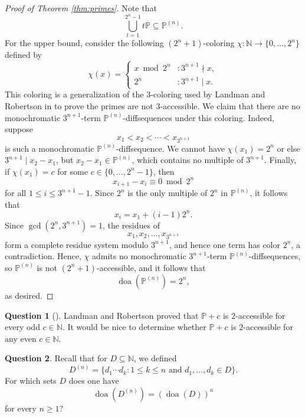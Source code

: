 \documentclass{amsart}
\theoremstyle{definition}
\newtheorem{question}{Question}
\begin{document}
\begin{proof}[Proof of Theorem \ref{thm:primes}]

Note that $$\bigcup_{t=1}^{2^n-1}t\mathbb{P}\subseteq \mathbb P^{(n)}.$$ For the upper bound, consider the following $(2^n+1)$-coloring $\chi : \mathbb{N} \to \{0,\dots,2^n\}$ defined by $$\chi(x)=\begin{cases}
    x\bmod 2^n & : 3^{n+1} \nmid x, \\
    2^n & : 3^{n+1} \mid x.
\end{cases}$$ This coloring is a generalization of the $3$-coloring used by Landman and Robertson in \cite{landman2007avoiding} to prove the primes are not $3$-accessible. We claim that there are no monochromatic $3^{n+1}$-term $\mathbb{P}^{(n)}$-diffsequences under this coloring. Indeed, suppose $$x_1<x_2<\cdots<x_{3^{n+1}}$$ is such a monochromatic $\mathbb{P}^{(n)}$-diffsequence. We cannot have $\chi(x_1)=2^n$ or else $3^{n+1} \mid x_{2}-x_1$, but $x_{2}-x_1 \in \mathbb{P}^{(n)}$, which contains no multiple of $3^{n+1}$. Finally, if $\chi(x_1)=c$ for some $c \in \{0,\dots,2^n-1\}$, then $$x_{i+1}-x_{i} \equiv 0 \bmod{2^n}$$ for all $1 \leq i \leq 3^{n+1}-1$. Since $2^n$ is the only multiple of $2^n$ in $\mathbb{P}^{(n)}$, it follows that $$x_{i}=x_1+(i-1)2^n.$$ Since $\gcd(2^n,3^{n+1})=1$, the residues of $$x_1,x_2,\dots,x_{3^{n+1}}$$ form a complete residue system modulo $3^{n+1}$, and hence one term has color $2^n$, a contradiction. Hence, $\chi$ admits no monochromatic $3^{n+1}$-term $\mathbb{P}^{(n)}$-diffsequences, so $\mathbb{P}^{(n)}$ is not $(2^n+1)$-accessible, and it follows that $$\operatorname{doa}(\mathbb{P}^{(n)})=2^n,$$ as desired. \end{proof}


\begin{question}[\cite{landman2007avoiding,landman2010avoiding}]

Landman and Robertson proved that $\mathbb{P}+c$ is $2$-accessible for every odd $c \in \mathbb{N}$. It would be nice to determine whether $\mathbb{P}+c$ is $2$-accessible for any even $c \in \mathbb{N}$. 
    
\end{question}
    

\begin{question}

Recall that for $D \subseteq \mathbb{N}$, we defined $$D^{(n)}=\{d_1\cdots d_k : 1 \leq k \leq n \text{ and } d_1,\dots,d_k \in D\}.$$ For which sets $D$ does one have $$\operatorname{doa}(D^{(n)})=(\operatorname{doa}(D))^n$$ for every $n\geq 1$?
    
\end{question}
\end{document}
